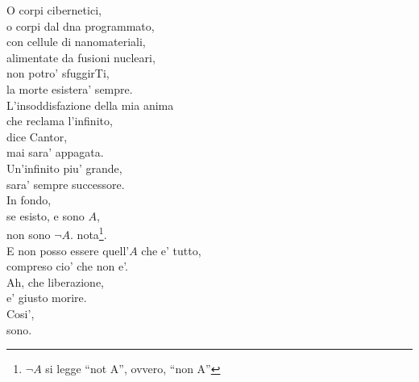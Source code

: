 \begin{haiku}
    O corpi cibernetici,\\
    o corpi dal dna programmato,\\
    con cellule di nanomateriali,\\
    alimentate da fusioni nucleari,\\
    non potro' sfuggirTi,\\
    la morte esistera' sempre.\\
    L'insoddisfazione della mia anima\\
    che reclama l'infinito,\\
    dice Cantor,\\
    mai sara' appagata.\\
    Un'infinito piu' grande,\\
    sara' sempre successore.\\
    In fondo,\\
    se esisto, e sono $A$,\\
    non sono $\lnot A$. \hspace{2cm} {\footnotesize nota}\footnote{$\lnot A$ si legge ``not A'', ovvero, ``non A''}.\\
    E non posso essere quell'$A$ che e' tutto, \\
    compreso cio' che non e'.\\
    Ah, che liberazione,\\
    e' giusto morire.\\
    Cosi',\\
    sono.\\
\end{haiku}
